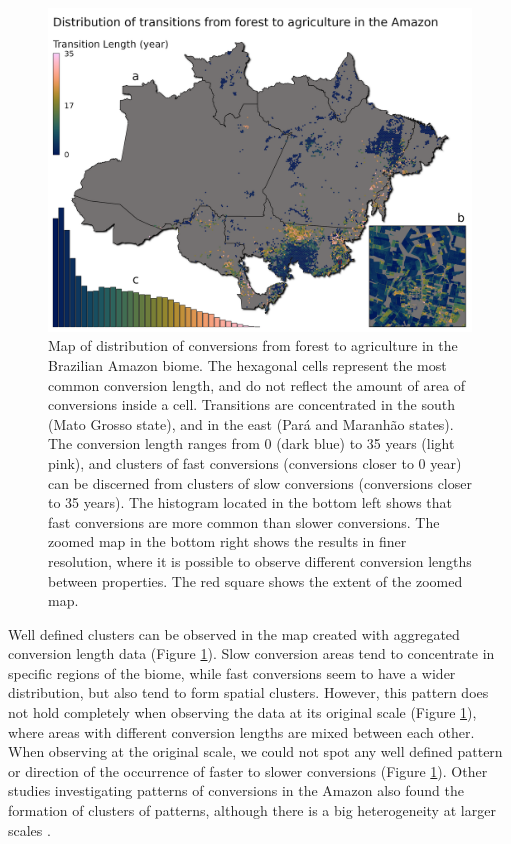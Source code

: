 \documentclass[essd, manuscript]{copernicus}
\begin{document}
\begin{figure}[h]
\includegraphics[width=17cm]{figs/map} \caption{Map of distribution of conversions from forest to agriculture in the Brazilian Amazon biome. The hexagonal cells represent the most common conversion length, and do not reflect the amount of area of conversions inside a cell. Transitions are concentrated in the south (Mato Grosso state), and in the east (Pará and Maranhão states). The conversion length ranges from 0 (dark blue) to 35 years (light pink), and clusters of fast conversions (conversions closer to 0 year) can be discerned from clusters of slow conversions (conversions closer to 35 years). The histogram located in the bottom left shows that fast conversions are more common than slower conversions. The zoomed map in the bottom right shows the results in finer resolution, where it is possible to observe different conversion lengths between properties. The red square shows the extent of the zoomed map.}\label{fig:map-plot}
\end{figure}

Well defined clusters can be observed in the map created with aggregated conversion length data (Figure \ref{fig:map-plot}).
Slow conversion areas tend to concentrate in specific regions of the biome, while fast conversions seem to have a wider distribution, but also tend to form spatial clusters.
However, this pattern does not hold completely when observing the data at its original scale (Figure \ref{fig:map-plot}), where areas with different conversion lengths are mixed between each other.
When observing at the original scale, we could not spot any well defined pattern or direction of the occurrence of faster to slower conversions (Figure \ref{fig:map-plot}).
Other studies investigating patterns of conversions in the Amazon also found the formation of clusters of patterns, although there is a big heterogeneity at larger scales \citep{MullerHansen2017}.
\end{document}
